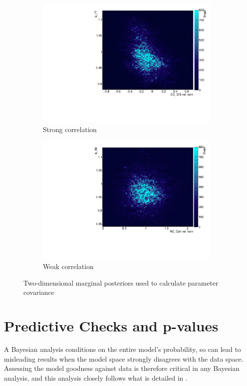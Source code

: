 \begin{figure}[h]
	\begin{subfigure}[t]{0.40\textwidth}
		\includegraphics[width=\textwidth, trim={0mm 0mm 0mm 0mm}, clip,page=1]{figures/mcmc/example_corr}
		\caption{Strong correlation}
	\end{subfigure}
	\begin{subfigure}[t]{0.40\textwidth}
		\includegraphics[width=\textwidth, trim={0mm 0mm 0mm 0mm}, clip,page=1]{figures/mcmc/example_corr2}
		\caption{Weak correlation}
	\end{subfigure}
	\caption{Two-dimensional marginal posteriors used to calculate parameter covariance}
	\label{fig:cov_2d_posterior}
\end{figure}

\section{Predictive Checks and p-values}
A Bayesian analysis conditions on the entire model's probability, so can lead to misleading results when the model space strongly disagrees with the data space. Assessing the model goodness against data is therefore critical in any Bayesian analysis, and this analysis closely follows what is detailed in \cite{posterior_predictive_checks, posterior_predictive_checks2, posterior_predictive_checks3, prior_predictive_checks}. 

